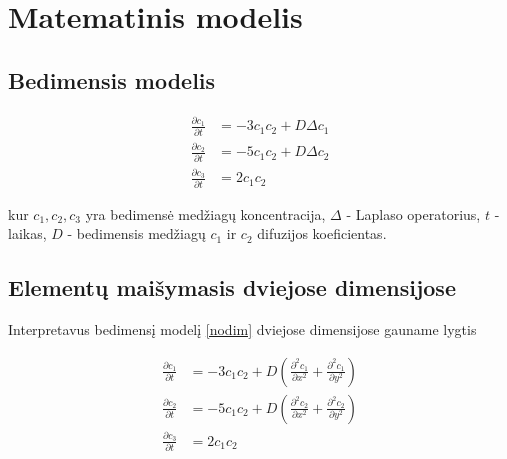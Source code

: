 \documentclass{VUMIFInfKursinis}
\begin{document}
%


\section{Matematinis modelis}

\subsection{Bedimensis modelis}

\begin{subequations} \label{nodim}
    \begin{align}
    \frac{\partial c_1}{\partial t}&=-3c_1c_2+D\Delta c_1\\
    \frac{\partial c_2}{\partial t}&=-5c_1c_2+D\Delta c_2\\
    \frac{\partial c_3}{\partial t}&=2c_1c_2
    \end{align}
\end{subequations}

kur $c_1,c_2,c_3$ yra bedimensė medžiagų koncentracija, 
$\Delta$ - Laplaso operatorius, $t$ - laikas, 
$D$ - bedimensis medžiagų $c_1$ ir $c_2$ difuzijos koeficientas.

\subsection{Elementų maišymasis dviejose dimensijose}

Interpretavus bedimensį modelį \eqref{nodim} dviejose dimensijose gauname lygtis

\begin{subequations} \label{rect}
    \begin{align}
    \frac{\partial c_1}{\partial t}&=-3c_1c_2+D\left(\frac{\partial^2c_1}{\partial x^2}+\frac{\partial^2c_1}{\partial y^2}\right)\\
    \frac{\partial c_2}{\partial t}&=-5c_1c_2+D\left(\frac{\partial^2c_2}{\partial x^2}+\frac{\partial^2c_2}{\partial y^2}\right)\\
    \frac{\partial c_3}{\partial t}&=2c_1c_2
    \end{align}
\end{subequations}
\end{document}
